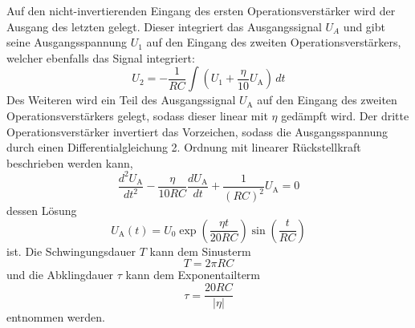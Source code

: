 Auf den nicht-invertierenden Eingang des ersten Operationsverstärker wird der
Ausgang des letzten gelegt.
Dieser integriert das Ausgangssignal $U_A$ und gibt seine Ausgangsspannung $U_1$ auf
den Eingang des zweiten Operationsverstärkers, welcher ebenfalls das Signal
integriert:
\begin{equation}
		\label{eq:ov2}
		U_2 = - \frac{1}{RC} \int \left( U_1 + \frac{\eta}{10} U_\text{A} \right) \, dt
\end{equation}
Des Weiteren wird ein Teil des Ausgangssignal $U_\text{A}$ auf den Eingang des
zweiten Operationsverstärkers gelegt, sodass dieser linear mit $\eta$ gedämpft wird.
Der dritte Operationsverstärker invertiert das Vorzeichen, sodass die
Ausgangsspannung durch einen Differentialgleichung 2. Ordnung mit linearer
Rückstellkraft beschrieben werden kann,
\begin{equation}
		\label{eq:schwingung_diff}
		\frac{d^2 U_\text{A}}{dt^2} - \frac{\eta}{10 R C} \frac{d
		U_\text{A}}{dt} + \frac{1}{(RC)^2} U_\text{A} = 0
\end{equation}
dessen Lösung
\begin{equation}
		U_\text{A}(t) = U_0 \exp \left( \frac{\eta t}{20 RC} \right)
    \sin \left(\frac{t}{RC}\right) \label{eq:tau}
\end{equation}
ist.
Die Schwingungsdauer $T$ kann dem Sinusterm
\begin{equation}
	T = 2 \pi R C
\end{equation}
und die Abklingdauer $\tau$ kann dem
Exponentailterm
\begin{equation}
		\tau = \frac{20 R C}{|\eta|}
\end{equation}
entnommen werden.

